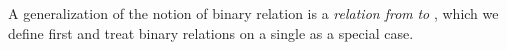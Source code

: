 A generalization of the notion of binary relation is a \emph{relation from}  \emph{to} , which we define first and treat binary relations on a single  as a special case.
\ccpad
\begin{code}
\>[1]\AgdaSpace{}%
\AgdaSymbol{:}\AgdaSpace{}%
%
\AgdaSpace{}%
\AgdaSpace{}%
%
\AgdaSpace{}%
\AgdaSpace{}%
\AgdaSymbol{(}\AgdaSpace{}%
\AgdaSymbol{:}\AgdaSpace{}%
\AgdaSymbol{)}\AgdaSpace{}%
\AgdaSpace{}%
\AgdaSymbol{(}\AgdaSpace{}%
\AgdaSpace{}%
\AgdaSpace{}%
\AgdaSpace{}%
\AgdaSpace{}%
\AgdaSymbol{)}%
\<%
\\
%
\>[1]\AgdaSpace{}%
\AgdaSpace{}%
\AgdaSpace{}%
\AgdaSpace{}%
\AgdaSymbol{=}\AgdaSpace{}%
\AgdaSpace{}%
\AgdaSpace{}%
\AgdaSpace{}%
\AgdaSpace{}%
%
\<%
\\
%
\\[\AgdaEmptyExtraSkip]%
%
\>[1]\AgdaSpace{}%
\AgdaSymbol{:}\AgdaSpace{}%
%
\AgdaSpace{}%
\AgdaSpace{}%
\AgdaSymbol{(}\AgdaSpace{}%
\AgdaSymbol{:}\AgdaSpace{}%
\AgdaSymbol{)}\AgdaSpace{}%
\AgdaSpace{}%
\AgdaSpace{}%
\AgdaSpace{}%
\AgdaSpace{}%
%
\<%
\\
%
\>[1]\AgdaSpace{}%
\AgdaSpace{}%
\AgdaSpace{}%
\AgdaSymbol{=}\AgdaSpace{}%
\AgdaSpace{}%
\AgdaSpace{}%
\AgdaSpace{}%
\<%
\end{code}


